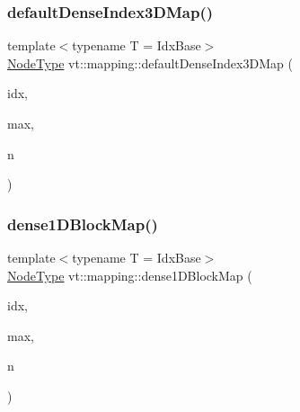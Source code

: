 \subsubsection{\texorpdfstring{default\+Dense\+Index3\+D\+Map()}{defaultDenseIndex3DMap()}}
{\footnotesize\ttfamily template$<$typename T  = Idx\+Base$>$ \\
\hyperlink{namespacevt_a866da9d0efc19c0a1ce79e9e492f47e2}{Node\+Type} vt\+::mapping\+::default\+Dense\+Index3\+D\+Map (\begin{DoxyParamCaption}\item[{\hyperlink{namespacevt_1_1mapping_aacc737158b6517f2d760ffc8d1b5abca}{Idx3\+D\+Ptr}$<$ T $>$}]{idx,  }\item[{\hyperlink{namespacevt_1_1mapping_aacc737158b6517f2d760ffc8d1b5abca}{Idx3\+D\+Ptr}$<$ T $>$}]{max,  }\item[{\hyperlink{namespacevt_a866da9d0efc19c0a1ce79e9e492f47e2}{Node\+Type}}]{n }\end{DoxyParamCaption})}

\mbox{\label{namespacevt_1_1mapping_a2d49151f03d4ce393b01c620f6b18517}} 
\subsubsection{\texorpdfstring{dense1\+D\+Block\+Map()}{dense1DBlockMap()}}
{\footnotesize\ttfamily template$<$typename T  = Idx\+Base$>$ \\
\hyperlink{namespacevt_a866da9d0efc19c0a1ce79e9e492f47e2}{Node\+Type} vt\+::mapping\+::dense1\+D\+Block\+Map (\begin{DoxyParamCaption}\item[{\hyperlink{namespacevt_1_1mapping_a8b576cf2f31069778e4951f64bccafd8}{Idx1\+D\+Ptr}$<$ T $>$}]{idx,  }\item[{\hyperlink{namespacevt_1_1mapping_a8b576cf2f31069778e4951f64bccafd8}{Idx1\+D\+Ptr}$<$ T $>$}]{max,  }\item[{\hyperlink{namespacevt_a866da9d0efc19c0a1ce79e9e492f47e2}{Node\+Type}}]{n }\end{DoxyParamCaption})}

\mbox{\label{namespacevt_1_1mapping_a2a4e62c5dc17da0032d3953c7e3cde8b}} 
